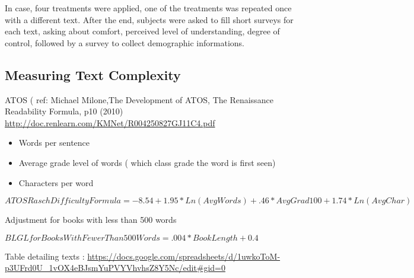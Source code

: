 In case, four treatments were applied, one of the treatments was repeated once with a different text. After the end, subjects were asked to fill short surveys for each text, asking about comfort, perceived level of understanding, degree of control, followed by a survey to collect demographic informations.

\subsection{Measuring Text Complexity}

ATOS  ( ref: Michael Milone,The Development of ATOS, The Renaissance Readability Formula, p10 (2010) \url{http://doc.renlearn.com/KMNet/R004250827GJ11C4.pdf}

\begin{itemize}
  \item Words per sentence
  \item Average grade level of words ( which class grade the word is first seen)
  \item Characters per word
\end{itemize}


$ATOS Rasch Difficulty Formula = -8.54 + 1.95 * Ln(AvgWords) + .46 * AvgGrad100 + 1.74 * Ln(AvgChar)$

Adjustment for books with less than 500 words

$BLGL for Books With Fewer Than 500 Words = .004 * Book Length + 0.4$


Table detailing texts : \url{https://docs.google.com/spreadsheets/d/1uwkoToM-p3UFrd0U_1vOX4eBJsmYuPVYVhvhsZ8Y5Nc/edit#gid=0}





